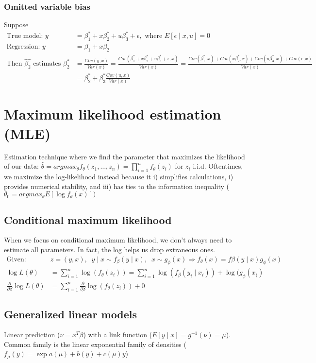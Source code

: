 \documentclass{article}
\begin{document}
\subsubsection{Omitted variable bias}
Suppose 
\begin{align*}
  \textrm{True model: } y &= \beta_1^* + x\beta_2^* + u\beta_3^* + \epsilon, \textrm{ where } E[\epsilon \mid x, u] = 0\\
  \textrm{Regression: } y &= \beta_1 + x\beta_2\\
  \textrm{Then } \hat{\beta_2} \textrm{ estimates } \beta_2^* &= \frac{Cov(y, x)}{Var(x)} = \frac{Cov(\beta_1^* + x\beta_2^* + u\beta_3^* + \epsilon, x)}{Var(x)} = \frac{Cov(\beta_1^*, x) + Cov(x\beta_2^*,x) + Cov(u\beta_3^*, x) + Cov(\epsilon, x)}{Var(x)}\\
  &= \beta_2^* + \beta_3^* \frac{Cov(u,x)}{Var(x)}
\end{align*}


\section{Maximum likelihood estimation (MLE)}
Estimation technique where we find the parameter that maximizes the likelihood of our data: $\hat{\theta} = argmax_\theta f_\theta(z_1, \dots, z_n) = \prod_{i=1}^n f_\theta(z_i)$ for $z_i$ i.i.d. 
Oftentimes, we maximize the log-likelihood instead because it i) simplifies calculations, i) provides numerical stability, and iii) has ties to the information inequality ($\theta_0 = argmax_\theta E[\log f_\theta(x)])$

\subsection{Conditional maximum likelihood}
When we focus on conditional maximum likelihood, we don't always need to estimate all parameters. In fact, the log helps us drop extraneous ones.
\begin{align*}
  \textrm{Given: }& z=(y,x), \;\; y\mid x \sim f_\beta(y\mid x), \;\; x \sim g_\phi(x) \Longrightarrow f_\theta(x) = f\beta(y\mid x) g_\phi(x)\\
  \log L(\theta) &= \sum_{i=1}^n \log(f_\theta(z_i)) = \sum_{i=1}^n \log(f_\beta(y_i\mid x_i)) + \log(g_\phi(x_))\\
  \frac{\partial}{\partial \beta} \log L(\theta) &= \sum_{i=1}^n \frac{\partial}{\partial \beta}\log(f_\theta(z_i)) + 0
\end{align*}

\subsection{Generalized linear models}
Linear prediction ($\nu = x^T\beta$) with a link function ($E[y\mid x] = g^{-1}(\nu) = \mu$). Common family is the linear exponential family of densities ($f_\mu(y) = \exp{a(\mu) + b(y) + c(\mu)y}$)
\end{document}
